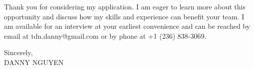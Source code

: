 \documentclass[letterpaper,11pt]{article}
\begin{document}
Thank you for considering my application. I am eager to learn more about this opportunity and discuss how my skills and experience can benefit your team. I am available for an interview at your earliest convenience and can be reached by email at tdn.danny@gmail.com or by phone at +1 (236) 838-3069.
\vspace{20pt}

Sincerely, \\
\vspace{40pt}
DANNY NGUYEN
\end{document}
